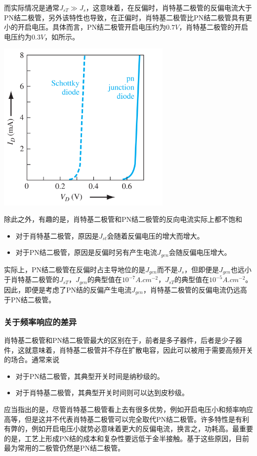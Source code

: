 而实际情况是通常$J_{sT}\gg J_s$，这意味着，在反偏时，肖特基二极管的反偏电流大于PN结二极管，另外该特性也导致，在正偏时，肖特基二极管比PN结二极管具有更小的开启电压。具体而言，PN结二极管开启电压约为$0.7\si{V}$，肖特基二极管的开启电压约为$0.3\si{V}$，如所示。
\begin{Figure}[肖特基二极管与PN结二极管的特性曲线对比]
    \includegraphics[width=8.5cm]{image/1.png}
\end{Figure}

除此之外，有趣的是，肖特基二极管和PN结二极管的反向电流实际上都不饱和
\begin{itemize}
    \item 对于肖特基二极管，原因是$J_{st}$会随着反偏电压的增大而增大。
    \item 对于PN结二极管，原因是反偏时另有产生电流$J_{gen}$会随反偏电压增大。
\end{itemize}

实际上，PN结二极管在反偏时占主导地位的是$J_{gen}$而不是$J_s$，但即便是$J_{gen}$也远小于肖特基二极管的$J_{sT}$，$J_{gen}$的典型值在$10^{-7}\si{A.cm^{-2}}$，$J_{sT}$的典型值在$10^{-5}\si{A.cm^{-2}}$。因此，即便是考虑了PN结的反偏产生电流$J_{gen}$，肖特基二极管的反偏电流仍远高于PN结二极管。

\subsubsection{关于频率响应的差异}
肖特基二极管和PN结二极管最大的区别在于，前者是多子器件，后者是少子器件，这就意味着，肖特基二极管并不存在扩散电容，因此可以被用于需要高频开关的场合。通常来说
\begin{itemize}
    \item 对于PN结二极管，其典型开关时间是纳秒级的。
    \item 对于肖特基二极管，其典型开关时间则可以达到皮秒级。
\end{itemize}

应当指出的是，尽管肖特基二极管看上去有很多优势，例如开启电压小和频率响应高等，但是这并不代表肖特基二极管可以完全取代PN结二极管。许多特性是有利有弊的，例如开启电压小就势必意味着更大的反偏电流，换言之，功耗高。最重要的是，工艺上形成PN结的成本和复杂性要远低于金半接触。基于这些原因，目前最为常用的二极管仍然是PN结二极管。

